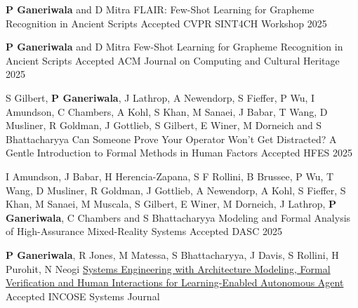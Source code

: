 \begin{cventries}
{\begin{cvitems}
\end{cvitems}
}
\cventry
{\textbf{P Ganeriwala} and D Mitra}
{	
FLAIR: Few-Shot Learning for Grapheme Recognition in Ancient Scripts}
{Accepted}
{CVPR SINT4CH Workshop 2025} 
{ %
\begin{cvitems}
\end{cvitems}
}
\cventry
{\textbf{P Ganeriwala} and D Mitra}
{	
Few-Shot Learning for Grapheme Recognition in Ancient Scripts}
{Accepted}
{ACM Journal on Computing and Cultural Heritage 2025} 
{ %
\begin{cvitems}
\end{cvitems}
}
\cventry
{S Gilbert, \textbf{P Ganeriwala}, J Lathrop, A Newendorp, S Fieffer, P Wu, I Amundson, C Chambers, A Kohl,  S Khan, M Sanaei, J Babar, T Wang, D Musliner, R Goldman, J Gottlieb, S Gilbert, E Winer, M Dorneich and S Bhattacharyya}
{Can Someone Prove Your Operator Won’t Get Distracted? A Gentle Introduction to Formal Methods in Human Factors}
{Accepted}
{HFES 2025} 
{ %
\begin{cvitems}
\end{cvitems}
}
\cventry
{I Amundson, J Babar, H Herencia-Zapana, S F Rollini, B Brussee, P Wu, T Wang, D Musliner, R Goldman, J Gottlieb, A Newendorp, A Kohl, S Fieffer, S Khan, M Sanaei, M Muscala, S Gilbert, E Winer, M Dorneich, J Lathrop, \textbf{P Ganeriwala}, C Chambers and S Bhattacharyya}
{Modeling and Formal Analysis of High-Assurance Mixed-Reality Systems}
{Accepted}
{DASC 2025} 
{ %
\begin{cvitems}
\end{cvitems}
}
\cventry
{\textbf{P Ganeriwala}, R Jones, M Matessa, S Bhattacharyya, J Davis, S Rollini, H Purohit, N Neogi}
{\href{https://incose.onlinelibrary.wiley.com/doi/10.1002/sys.21816?af=R}{Systems Engineering with Architecture Modeling, Formal Verification and Human Interactions for Learning-Enabled Autonomous Agent}}
{Accepted}
{INCOSE Systems Journal} 
{ %
\begin{cvitems}

\end{cvitems}}
\end{cventries}
